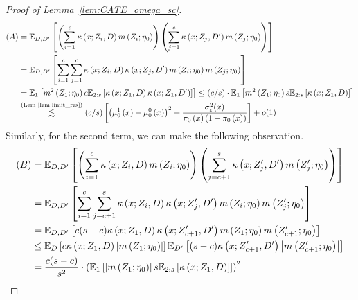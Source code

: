 \begin{proof}[Proof of Lemma~\ref{lem:CATE_omega_sc}]
\begin{equation}
\begin{aligned}
            (A)
            & = \mathbb{E}_{D, D^{\prime}}\left[\left(\sum_{i = 1}^{c} \kappa\left(x; Z_{i}, D\right) m\left(Z_{i}; \eta_{0}\right)\right)
            \left(\sum_{j = 1}^{c} \kappa\left(x; Z_{j}, D^{\prime}\right) m\left(Z_{j}; \eta_{0}\right)\right)\right] \\
			& = \mathbb{E}_{D, D^{\prime}}\left[
				\sum_{i = 1}^{c} \sum_{j = 1}^{c} \kappa\left(x; Z_{i}, D\right)\kappa\left(x; Z_{j}, D^{\prime}\right) m\left(Z_{i}; \eta_{0}\right)m\left(Z_{j}; \eta_{0}\right)
			\right] \\
			& = \mathbb{E}_{1}\left[m^{2}\left(Z_{1}; \eta_{0}\right) c \mathbb{E}_{2:s}\left[\kappa\left(x; Z_{1}, D\right)\kappa\left(x; Z_{1}, D^{\prime}\right)\right]\right]
			\leq (c/s) \cdot \mathbb{E}_{1}\left[m^{2}\left(Z_{1}; \eta_{0}\right) s \mathbb{E}_{2:s}\left[\kappa\left(x; Z_{1}, D\right)\right]\right]\\
			& \overset{\text{(Lem~\ref{lem:limit_res})}}{\lesssim} (c/s) \left[\left(\mu_{0}^{1}\left(x\right) - \mu_{0}^{0}\left(x\right)\right)^2 + \frac{\sigma_{\varepsilon}^2(x)}{\pi_{0}\left(x\right)\left(1 - \pi_{0}\left(x\right)\right)}\right] + o(1)
        \end{aligned}
    \end{equation}
	Similarly, for the second term, we can make the following observation.
	\begin{equation}
		\begin{aligned}
			(B) 
			& = \E_{D, D^{\prime}}\left[\left(\sum_{i = 1}^{c} \kappa\left(x; Z_{i}, D\right) m\left(Z_{i}; \eta_{0}\right)\right)
            \left(\sum_{j = c + 1}^{s} \kappa\left(x; Z_{j}^{\prime}, D^{\prime}\right) m\left(Z_{j}^{\prime}; \eta_{0}\right)\right)\right] \\
			& = \E_{D,D^{\prime}}\left[\sum_{i = 1}^{c} \sum_{j = c + 1}^{s}\kappa\left(x; Z_{i}, D\right)\kappa\left(x; Z_{j}^{\prime}, D^{\prime}\right) 
			m\left(Z_{i}; \eta_{0}\right)m\left(Z_{j}^{\prime}; \eta_{0}\right)\right]\\
			& = \E_{D, D^{\prime}}\left[c (s-c) \kappa\left(x; Z_{1}, D\right)\kappa\left(x; Z_{c+1}^{\prime}, D^{\prime}\right) 
			m\left(Z_{1}; \eta_{0}\right) m\left(Z_{c+1}^{\prime}; \eta_{0}\right)\right]\\
			& \leq \E_{D}\left[c \kappa\left(x; Z_{1}, D\right)  \left|m\left(Z_{1}; \eta_{0}\right)\right|\right]
			\E_{D^{\prime}}\left[(s-c) \kappa\left(x; Z_{c+1}^{\prime}, D^{\prime}\right)  \left| m\left(Z_{c+1}^{\prime}; \eta_{0}\right) \right|\right]\\
			& = \frac{c(s-c)}{s^2} \cdot \left(\E_{1}\left[\left|m\left(Z_{1}; \eta_{0}\right)\right| s \E_{2:s}\left[\kappa\left(x; Z_{1}, D\right)\right]\right]\right)^2\\

\end{aligned}
\end{equation}
\end{proof}
